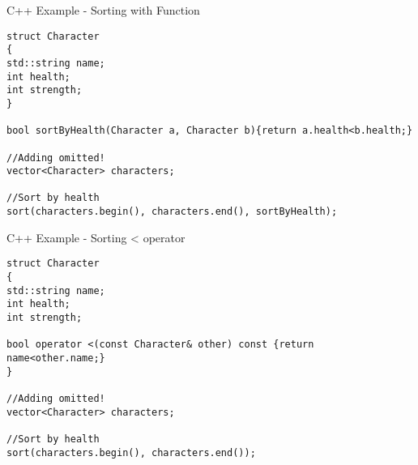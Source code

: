 \begin{frame}[fragile]{C++ Example - Sorting with Function }
\begin{lstlisting}
struct Character
{
std::string name;
int health;
int strength;
}

bool sortByHealth(Character a, Character b){return a.health<b.health;}

//Adding omitted!
vector<Character> characters;

//Sort by health
sort(characters.begin(), characters.end(), sortByHealth);
\end{lstlisting}
\end{frame}

\begin{frame}[fragile]{C++ Example - Sorting < operator }
\begin{lstlisting}
struct Character
{
std::string name;
int health;
int strength;

bool operator <(const Character& other) const {return name<other.name;}
}

//Adding omitted!
vector<Character> characters;

//Sort by health
sort(characters.begin(), characters.end());
\end{lstlisting}
\end{frame}
